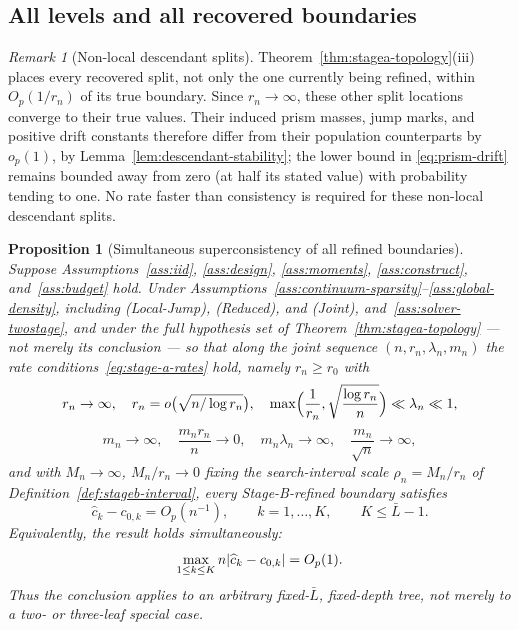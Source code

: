 \documentclass[11pt]{article}
\theoremstyle{plain}
\newtheorem{proposition}[theorem]{Proposition}
\theoremstyle{definition}
\theoremstyle{remark}
\newtheorem{remark}[theorem]{Remark}
\DeclarePairedDelimiter{\abs}{\lvert}{\rvert}
\begin{document}
\subsection{All levels and all recovered boundaries}\label{sec:stageb-all}

\begin{remark}[Non-local descendant splits]
\label{rem:nonlocal-descendants}
Theorem~\ref{thm:stagea-topology}(iii) places every recovered split, not
only the one currently being refined, within \(O_p(1/r_n)\) of its true
boundary.
Since \(r_n\to\infty\), these
other split locations converge to their true values.  Their induced prism
masses, jump marks, and positive drift constants therefore differ from their
population counterparts by \(o_p(1)\), by Lemma~\ref{lem:descendant-stability};
the lower bound in
\eqref{eq:prism-drift} remains bounded away from zero (at half its stated
value) with probability tending
to one.  No rate faster than consistency is required for these non-local
descendant splits.
\end{remark}

\begin{proposition}[Simultaneous superconsistency of all refined boundaries]
\label{prop:twostage-superconsistency}
Suppose Assumptions~\ref{ass:iid}, \ref{ass:design}, \ref{ass:moments},
\ref{ass:construct}, and~\ref{ass:budget} hold.
Under Assumptions~\ref{ass:continuum-sparsity}--\ref{ass:global-density},
including (Local-Jump), (Reduced), and (Joint),
and~\ref{ass:solver-twostage}, and under the full hypothesis set of
Theorem~\ref{thm:stagea-topology} --- not merely its conclusion --- so
that along the joint sequence \((n,r_n,\lambda_n,m_n)\) the rate
conditions~\eqref{eq:stage-a-rates} hold, namely \(r_n\ge r_0\) with
\[
  r_n\to\infty,
  \quad
  r_n=o\bigl(\sqrt{n/\log r_n}\bigr),
  \quad
  \max\Bigl(\frac1{r_n},\sqrt{\frac{\log r_n}{n}}\Bigr)\ll\lambda_n\ll1,
\]
\[
  m_n\to\infty,
  \quad
  \frac{m_nr_n}{n}\to0,
  \quad
  m_n\lambda_n\to\infty,
  \quad
  \frac{m_n}{\sqrt n}\to\infty,
\]
and with \(M_n\to\infty\), \(M_n/r_n\to0\) fixing the search-interval scale
\(\rho_n=M_n/r_n\) of Definition~\ref{def:stageb-interval}, every
Stage-B-refined boundary
satisfies
\[
  \widehat c_k-c_{0,k}=O_p(n^{-1}),
  \qquad k=1,\ldots,K,
  \qquad K\le\bar L-1.
\]
Equivalently, the result holds simultaneously:
\[
  \max_{1\le k\le K}
  n\abs{\widehat c_k-c_{0,k}}
  =
  O_p(1).
\]
Thus the conclusion applies to an arbitrary fixed-\(\bar L\), fixed-depth
tree, not merely to a two- or three-leaf special case.
\end{proposition}
\end{document}
